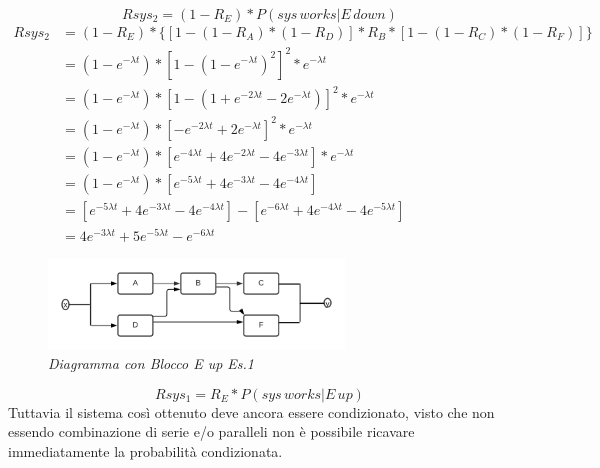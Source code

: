 \begin{equation*}
	Rsys_2 = (1-R_E)*P(sys\,works|E\,down)
\end{equation*}
\begin{equation*}
	\begin{split}
		Rsys_2 &= (1-R_E)*\{[1-(1-R_A)*(1-R_D)]*R_B*[1-(1-R_C)*(1-R_F)]\} \\
		&= (1-e^{-\lambda t})*[1-(1-e^{-\lambda t})^{2}]^{2}*e^{-\lambda t} \\
		&= (1-e^{-\lambda t})*[1-(1+e^{-2\lambda t}-2e^{-\lambda t})]^{2}*e^{-\lambda t} \\
		&= (1-e^{-\lambda t})*[-e^{-2\lambda t}+2e^{-\lambda t}]^{2}*e^{-\lambda t} \\
		&= (1-e^{-\lambda t})*[e^{-4\lambda t}+4e^{-2\lambda t}-4e^{-3\lambda t}]*e^{-\lambda t} \\
		&=(1-e^{-\lambda t})*[e^{-5\lambda t}+4e^{-3\lambda t}-4e^{-4\lambda t}] \\
		&= [e^{-5\lambda t}+4e^{-3\lambda t}-4e^{-4\lambda t}] - [e^{-6\lambda t}+4e^{-4\lambda t}-4e^{-5\lambda t}] \\
		&= 4e^{-3\lambda t}+5e^{-5\lambda t}-e^{-6\lambda t}
	\end{split}
\end{equation*}
\begin{figure}[H]
	\centering
	\includegraphics[width=0.7\textwidth]{img/hw5/e_up.png}
	\caption{\textit{Diagramma con Blocco E up Es.1}}
\end{figure}
\begin{equation*}
	Rsys_1 = R_E*P(sys\,works|E\,up)
\end{equation*}
Tuttavia il sistema così ottenuto deve ancora essere condizionato, visto che non essendo combinazione di serie e/o paralleli non è possibile ricavare immediatamente la probabilità condizionata.

